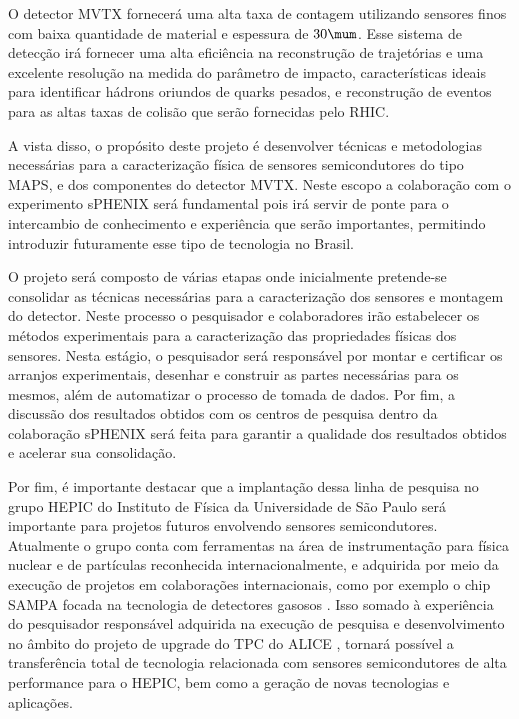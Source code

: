 O detector MVTX fornecerá uma alta taxa de contagem utilizando sensores finos com baixa quantidade de material e espessura de $30\mum$. Esse sistema de detecção irá fornecer uma alta eficiência na reconstrução de trajetórias e uma excelente resolução na medida do parâmetro de impacto, características ideais para identificar hádrons oriundos de quarks pesados, e reconstrução de eventos 
para as altas taxas de colisão que serão fornecidas pelo RHIC.

A vista disso, o propósito deste projeto é desenvolver técnicas e metodologias necessárias para a caracterização física de sensores semicondutores do tipo MAPS, e dos componentes do detector MVTX. Neste escopo a colaboração com o experimento sPHENIX será fundamental pois irá servir de ponte para o intercambio de conhecimento e experiência que serão importantes, permitindo introduzir futuramente esse tipo de tecnologia no Brasil.

O projeto será composto de várias etapas onde inicialmente pretende-se consolidar as técnicas necessárias para a caracterização dos sensores e montagem do detector. Neste processo o pesquisador e colaboradores irão estabelecer os 
métodos experimentais para a caracterização das propriedades físicas dos sensores. Nesta estágio, o pesquisador será responsável por montar e certificar os arranjos experimentais, desenhar e construir as partes necessárias para os mesmos, além de automatizar o processo de tomada de dados. Por fim, a discussão dos resultados obtidos com os centros de pesquisa dentro da colaboração sPHENIX será feita para garantir a qualidade dos resultados obtidos e acelerar sua consolidação.

Por fim, é importante destacar que a implantação dessa linha de pesquisa no grupo HEPIC do Instituto de Física da Universidade de São Paulo será importante para projetos futuros envolvendo sensores semicondutores. Atualmente o grupo conta com ferramentas na área de instrumentação para física nuclear e de partículas reconhecida internacionalmente, e adquirida por meio da execução de projetos em colaborações internacionais, como por exemplo o chip SAMPA focada na tecnologia de detectores gasosos \cite{ref1}. Isso somado à experiência do pesquisador responsável adquirida na execução de pesquisa e desenvolvimento no âmbito do projeto de upgrade do TPC do ALICE \cite{tpcNIM,discharge_paper,GSI_REPO}, tornará possível a transferência total de tecnologia relacionada com sensores semicondutores de alta performance para o HEPIC, bem como a geração de novas tecnologias e aplicações.

\renewcommand{\cleardoublepage}{}
\renewcommand{\clearpage}{}